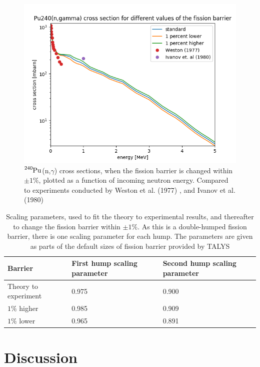 \documentclass[]{article}
\begin{document}
  \begin{figure} [H]
	\centering
	\includegraphics[scale=0.7]{Gamma_cross_section_varying_fission_barrier.png}
	\caption{ $\ce{^{240}Pu}$(n,$\gamma$) cross sections, when the fission barrier is changed within $\pm 1 \%$, plotted as a function of incoming neutron energy. Compared to experiments conducted by Weston et al. (1977) \cite{Weston1977}, and Ivanov et al. (1980) \cite{Ivanov1980}}
	\label{fig:Gamma_cross_section_varying_fission_barrier}
\end{figure}

\begin{table} [H]
	\centering
	\caption{Scaling parameters, used to fit the theory to experimental results, and thereafter to change the fission barrier within $\pm 1 \%$. As this is a double-humped fission barrier, there is one scaling parameter for each hump. The parameters are given as parts of the default sizes of fission barrier provided by TALYS}
	\begin{tabularx}{\textwidth}{XXX} \hline
		\label{tab:scalingparm_fission_barrier}
		Barrier & First hump scaling parameter & Second hump scaling parameter\\ \hline
		Theory to experiment & 0.975 & 0.900 \\
		$1 \% $ higher & 0.985  & 0.909  \\
		$1 \% $ lower & 0.965 & 0.891 \\ \hline
	\end{tabularx}
\end{table}

\section{Discussion}
\end{document}
